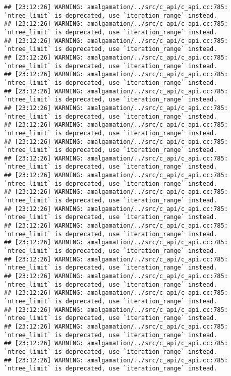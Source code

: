 \documentclass[
]{article}
\begin{document}
\begin{verbatim}
## [23:12:26] WARNING: amalgamation/../src/c_api/c_api.cc:785: `ntree_limit` is deprecated, use `iteration_range` instead.
## [23:12:26] WARNING: amalgamation/../src/c_api/c_api.cc:785: `ntree_limit` is deprecated, use `iteration_range` instead.
## [23:12:26] WARNING: amalgamation/../src/c_api/c_api.cc:785: `ntree_limit` is deprecated, use `iteration_range` instead.
## [23:12:26] WARNING: amalgamation/../src/c_api/c_api.cc:785: `ntree_limit` is deprecated, use `iteration_range` instead.
## [23:12:26] WARNING: amalgamation/../src/c_api/c_api.cc:785: `ntree_limit` is deprecated, use `iteration_range` instead.
## [23:12:26] WARNING: amalgamation/../src/c_api/c_api.cc:785: `ntree_limit` is deprecated, use `iteration_range` instead.
## [23:12:26] WARNING: amalgamation/../src/c_api/c_api.cc:785: `ntree_limit` is deprecated, use `iteration_range` instead.
## [23:12:26] WARNING: amalgamation/../src/c_api/c_api.cc:785: `ntree_limit` is deprecated, use `iteration_range` instead.
## [23:12:26] WARNING: amalgamation/../src/c_api/c_api.cc:785: `ntree_limit` is deprecated, use `iteration_range` instead.
## [23:12:26] WARNING: amalgamation/../src/c_api/c_api.cc:785: `ntree_limit` is deprecated, use `iteration_range` instead.
## [23:12:26] WARNING: amalgamation/../src/c_api/c_api.cc:785: `ntree_limit` is deprecated, use `iteration_range` instead.
## [23:12:26] WARNING: amalgamation/../src/c_api/c_api.cc:785: `ntree_limit` is deprecated, use `iteration_range` instead.
## [23:12:26] WARNING: amalgamation/../src/c_api/c_api.cc:785: `ntree_limit` is deprecated, use `iteration_range` instead.
## [23:12:26] WARNING: amalgamation/../src/c_api/c_api.cc:785: `ntree_limit` is deprecated, use `iteration_range` instead.
## [23:12:26] WARNING: amalgamation/../src/c_api/c_api.cc:785: `ntree_limit` is deprecated, use `iteration_range` instead.
## [23:12:26] WARNING: amalgamation/../src/c_api/c_api.cc:785: `ntree_limit` is deprecated, use `iteration_range` instead.
## [23:12:26] WARNING: amalgamation/../src/c_api/c_api.cc:785: `ntree_limit` is deprecated, use `iteration_range` instead.
## [23:12:26] WARNING: amalgamation/../src/c_api/c_api.cc:785: `ntree_limit` is deprecated, use `iteration_range` instead.
## [23:12:26] WARNING: amalgamation/../src/c_api/c_api.cc:785: `ntree_limit` is deprecated, use `iteration_range` instead.
## [23:12:26] WARNING: amalgamation/../src/c_api/c_api.cc:785: `ntree_limit` is deprecated, use `iteration_range` instead.
## [23:12:26] WARNING: amalgamation/../src/c_api/c_api.cc:785: `ntree_limit` is deprecated, use `iteration_range` instead.
## [23:12:26] WARNING: amalgamation/../src/c_api/c_api.cc:785: `ntree_limit` is deprecated, use `iteration_range` instead.

\end{verbatim}
\end{document}
